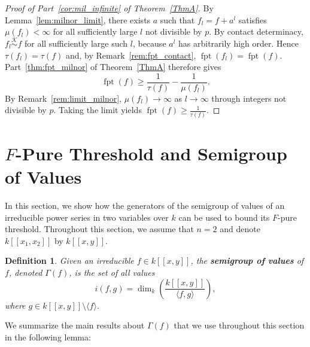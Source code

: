 \documentclass{article}
\newtheorem{definition}[theorem]{Definition}
\DeclareMathOperator{\fpt}{fpt}
\newcommand{\equivk}{\overset{\mathcal{K}}{\sim}}
\numberwithin{theorem}{section}
\begin{document}
\begin{proof}[Proof of Part~\ref{cor:mil_infinite} of Theorem~\ref{ThmA}]
By Lemma~\ref{lem:milnor_limit}, there exists $a$ such that $f_l=f+a^l$ satisfies $\mu(f_l)<\infty$ for all sufficiently large $l$ not divisible by $p$. By contact determinacy, $f_l\equivk f$ for all sufficiently large such $l$, because $a^l$ has arbitrarily high order. Hence $\tau(f_l)=\tau(f)$ and, by Remark~\ref{rem:fpt_contact}, $\fpt(f_l)=\fpt(f)$. Part~\ref{thm:fpt_milnor} of Theorem~\ref{ThmA} therefore gives
\[
    \fpt(f)\geq\frac{1}{\tau(f)}-\frac{1}{\mu(f_l)}.
\]
By Remark~\ref{rem:limit_milnor}, $\mu(f_l)\to\infty$ as $l\to\infty$ through integers not divisible by $p$. Taking the limit yields $\fpt(f)\geq\frac{1}{\tau(f)}$.
\end{proof}

\section{$F$-Pure Threshold and Semigroup of Values}

In this section, we show how the generators of the semigroup of values of an irreducible power series in two variables over $k$ can be used to bound its $F$-pure threshold. Throughout this section, we assume that $n=2$ and denote $k[[x_1,x_2]]$ by $k[[x,y]]$.

\begin{definition}\label{def:semigroup}
Given an irreducible $f\in k[[x,y]]$, the \textbf{semigroup of values} of $f$, denoted $\Gamma(f)$, is the set of all values
\[
i(f,g)=\dim_k\left(\frac{k[[x,y]]}{\langle f,g\rangle}\right),
\]
where $g\in k[[x,y]]\setminus\langle f\rangle$.
\end{definition}

We summarize the main results about $\Gamma(f)$ that we use throughout this section in the following lemma:
\end{document}
